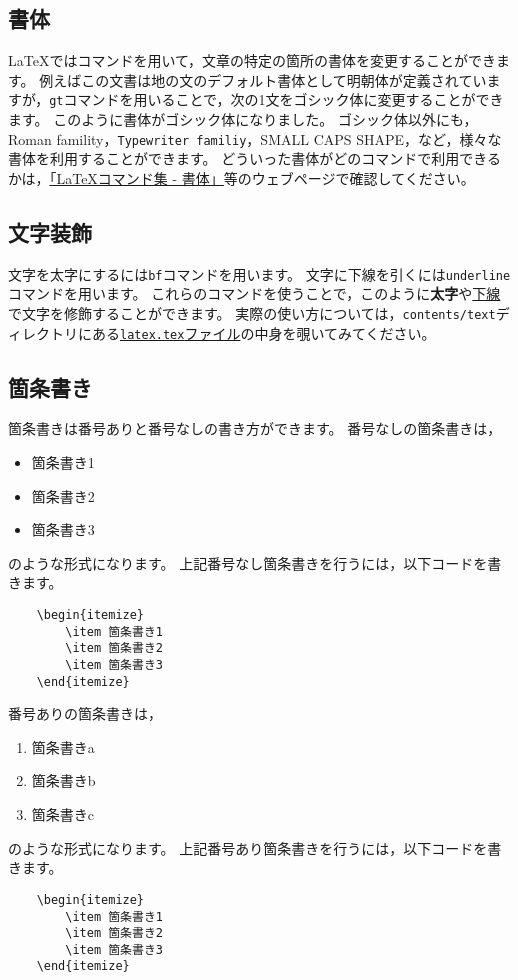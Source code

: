\subsection{書体}
LaTeXではコマンドを用いて，文章の特定の箇所の書体を変更することができます。
例えばこの文書は地の文のデフォルト書体として明朝体が定義されていますが，{\tt gt}コマンドを用いることで，次の1文をゴシック体に変更することができます。
{\gt このように書体がゴシック体になりました。}
{\gt ゴシック体}以外にも，{\rm Roman famility}，{\tt Typewriter familiy}，{\sc SMALL CAPS SHAPE}，など，様々な書体を利用することができます。
どういった書体がどのコマンドで利用できるかは，\href{http://www.latex-cmd.com/style/style.html}{「LaTeXコマンド集 - 書体」}等のウェブページで確認してください。


\subsection{文字装飾}
文字を太字にするには{\tt bf}コマンドを用います。
文字に下線を引くには{\tt underline}コマンドを用います。
これらのコマンドを使うことで，このように{\bf 太字}や\underline{下線}で文字を修飾することができます。
実際の使い方については，\texttt{contents/text}ディレクトリにある\href{https://github.com/ymmt3-lab/DEIM-and-Thesis/blob/master/contents/text/latex.tex}{\texttt{latex.tex}ファイル}の中身を覗いてみてください。


\subsection{箇条書き}
箇条書きは番号ありと番号なしの書き方ができます。
番号なしの箇条書きは，
\begin{itemize}
\item 箇条書き1
\item 箇条書き2
\item 箇条書き3
\end{itemize}
のような形式になります。
上記番号なし箇条書きを行うには，以下コードを書きます。
\begin{verbatim}
    \begin{itemize}
        \item 箇条書き1
        \item 箇条書き2
        \item 箇条書き3
    \end{itemize}
\end{verbatim}

番号ありの箇条書きは，
\begin{enumerate}
\item 箇条書きa
\item 箇条書きb
\item 箇条書きc
\end{enumerate}
のような形式になります。
上記番号あり箇条書きを行うには，以下コードを書きます。
\begin{verbatim}
    \begin{itemize}
        \item 箇条書き1
        \item 箇条書き2
        \item 箇条書き3
    \end{itemize}
\end{verbatim}



